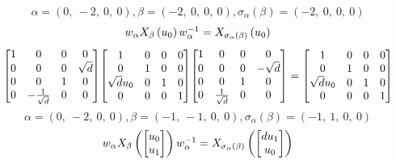 \documentclass[11pt]{article}
\theoremstyle{definition}
\begin{document}
\[
\alpha = \left( 0, \  -2, \  0, \  0\right), \beta = \left( -2, \  0, \  0, \  0\right), \sigma_{\alpha}(\beta) = \left( -2, \  0, \  0, \  0\right)
\]
\[
\scaletoalign{\textwidth}{w_{\alpha} X_{\beta}\left(u_{0}\right) w_{\alpha}^{-1} = X_{\sigma_{\alpha}\left(\beta\right)}\left(u_{0}\right)}
\]
\[
\scaletoalign{\textwidth}{{\left[\begin{matrix}1 & 0 & 0 & 0\\0 & 0 & 0 & \sqrt{d}\\0 & 0 & 1 & 0\\0 & - \frac{1}{\sqrt{d}} & 0 & 0\end{matrix}\right]} {\left[\begin{matrix}1 & 0 & 0 & 0\\0 & 1 & 0 & 0\\\sqrt{d} u_{0} & 0 & 1 & 0\\0 & 0 & 0 & 1\end{matrix}\right]} {\left[\begin{matrix}1 & 0 & 0 & 0\\0 & 0 & 0 & - \sqrt{d}\\0 & 0 & 1 & 0\\0 & \frac{1}{\sqrt{d}} & 0 & 0\end{matrix}\right]} = {\left[\begin{matrix}1 & 0 & 0 & 0\\0 & 1 & 0 & 0\\\sqrt{d} u_{0} & 0 & 1 & 0\\0 & 0 & 0 & 1\end{matrix}\right]}}
\]
\[
\alpha = \left( 0, \  -2, \  0, \  0\right), \beta = \left( -1, \  -1, \  0, \  0\right), \sigma_{\alpha}(\beta) = \left( -1, \  1, \  0, \  0\right)
\]
\[
\scaletoalign{\textwidth}{w_{\alpha} X_{\beta}\left(\left[\begin{matrix}u_{0}\\u_{1}\end{matrix}\right]\right) w_{\alpha}^{-1} = X_{\sigma_{\alpha}\left(\beta\right)}\left(\left[\begin{matrix}d u_{1}\\u_{0}\end{matrix}\right]\right)}
\]
\end{document}
